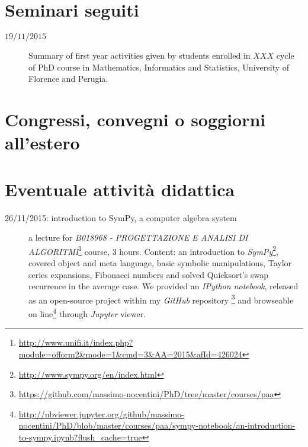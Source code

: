 \documentclass[11pt]{article}
\begin{document}
\section*{Seminari seguiti}

\begin{description}

    \item[$19/11/2015$] Summary of first year activities given by students enrolled in $XXX$ cycle of PhD
        course in Mathematics, Informatics and Statistics, University of Florence and Perugia.

\end{description}


\section*{Congressi, convegni o soggiorni all'estero}

\begin{description}

\item[%
] 

\end{description}


\section*{Eventuale attivit\`a didattica}

\begin{description}

\item[26/11/2015: introduction to SymPy, a computer algebra system] a lecture for 
    \emph{B018968 - PROGETTAZIONE E ANALISI DI ALGORITMI}\footnote{\url{http://www.unifi.it/index.php?module=ofform2\&mode=1\&cmd=3\&AA=2015\&afId=426024}} 
    course, 3 hours. Content: an introduction to 
    \emph{SymPy}\footnote{\url{http://www.sympy.org/en/index.html}}, covered object and meta language, basic symbolic 
    manipulations, Taylor series expansions, Fibonacci numbers and solved Quicksort's swap recurrence
    in the average case. We provided an \emph{IPython notebook}, released as an open-source project within
    my \emph{GitHub} repository \footnote{\url{https://github.com/massimo-nocentini/PhD/tree/master/courses/paa}}
    and browseable on line\footnote{\url{http://nbviewer.jupyter.org/github/massimo-nocentini/PhD/blob/master/courses/paa/sympy-notebook/an-introduction-to-sympy.ipynb?flush\_cache=true}} 
    through \emph{Jupyter} viewer.

\end{description}
\end{document}
